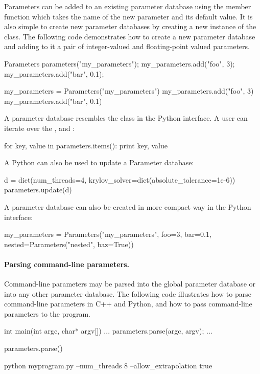 Parameters can be added to an existing parameter database using the
 member function which takes the name of the new parameter
and its default value. It is also simple to create new parameter
databases by creating a new instance of the 
class. The following code demonstrates how to create a new parameter
database and adding to it a pair of integer-valued and floating-point
valued parameters.
\begin{c++}
Parameters parameters("my_parameters");
my_parameters.add("foo", 3);
my_parameters.add("bar", 0.1);
\end{c++}
\begin{python}
my_parameters = Parameters("my_parameters")
my_parameters.add("foo", 3)
my_parameters.add("bar", 0.1)
\end{python}
A parameter database resembles the  class in the Python
interface. A user can iterate over the ,  and
:
\begin{python}
for key, value in parameters.items():
    print key, value
\end{python}
A Python  can also be used to update a Parameter
database:
\begin{python}
d = dict(num_threads=4, krylov_solver=dict(absolute_tolerance=1e-6))
parameters.update(d)
\end{python}
A parameter database can also be created in more compact way in the
Python interface:
\begin{python}
my_parameters = Parameters("my_parameters", foo=3, bar=0.1,
                           nested=Parameters("nested", baz=True))
\end{python}

\paragraph{Parsing command-line parameters.}

Command-line parameters may be parsed into the global parameter database
or into any other parameter database. The following code illustrates
how to parse command-line parameters in C++ and Python, and how to pass
command-line parameters to the program.
\begin{c++}
int main(int argc, char* argv[])
{
  ...
  parameters.parse(argc, argv);
  ...
}
\end{c++}
\begin{python}
parameters.parse()
\end{python}
\begin{bash}
python myprogram.py --num_threads 8 --allow_extrapolation true
\end{bash}

